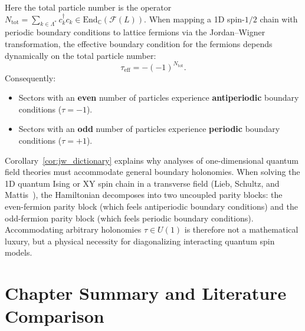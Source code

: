 \begin{corollary}
\label{cor:jw_dictionary}
Here the total particle number is the operator $N_{\mathrm{tot}}=\sum_{k\in\Lambda^*}c_k^\dagger c_k\in\mathrm{End}_{\mathbb C}(\mathcal F(L))$. When mapping a 1D spin-$1/2$ chain with periodic boundary conditions to lattice fermions via the Jordan--Wigner transformation, the effective boundary condition for the fermions depends dynamically on the total particle number:
\begin{equation}
\tau_{\mathrm{eff}} = - (-1)^{N_{\mathrm{tot}}}.
\end{equation}
Consequently:
\begin{itemize}
    \item Sectors with an \textbf{even} number of particles experience \textbf{antiperiodic} boundary conditions ($\tau = -1$).
    \item Sectors with an \textbf{odd} number of particles experience \textbf{periodic} boundary conditions ($\tau = +1$).
\end{itemize}
\end{corollary}

\begin{remark}
Corollary~\ref{cor:jw_dictionary} explains why analyses of one-dimensional quantum field theories must accommodate general boundary holonomies. When solving the 1D quantum Ising or XY spin chain in a transverse field (Lieb, Schultz, and Mattis~\cite{lieb1961}), the Hamiltonian decomposes into two uncoupled parity blocks: the even-fermion parity block (which feels antiperiodic boundary conditions) and the odd-fermion parity block (which feels periodic boundary conditions). Accommodating arbitrary holonomies $\tau \in U(1)$ is therefore not a mathematical luxury, but a physical necessity for diagonalizing interacting quantum spin models.
\end{remark}

\section{Chapter Summary and Literature Comparison}

